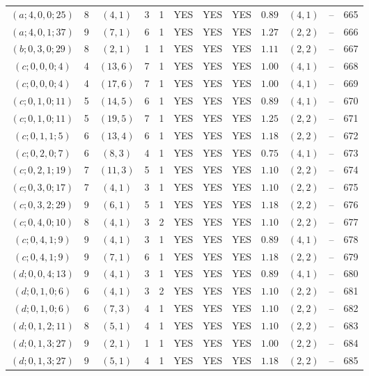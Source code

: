 \begin{longtable}{|c|c|c|c|c|c|c|c|c|c|c|c|}
$(a;4,0,0;25)$ & 8 & $(4,1)$ & 3 & 1 & YES & YES & YES & $0.89$ & $(4,1)$ & -- & 665\\
$(a;4,0,1;37)$ & 9 & $(7,1)$ & 6 & 1 & YES & YES & YES & $1.27$ & $(2,2)$ & -- & 666\\
$(b;0,3,0;29)$ & 8 & $(2,1)$ & 1 & 1 & YES & YES & YES & $1.11$ & $(2,2)$ & -- & 667\\
$(c;0,0,0;4)$ & 4 & $(13,6)$ & 7 & 1 & YES & YES & YES & $1.00$ & $(4,1)$ & -- & 668\\
$(c;0,0,0;4)$ & 4 & $(17,6)$ & 7 & 1 & YES & YES & YES & $1.00$ & $(4,1)$ & -- & 669\\
$(c;0,1,0;11)$ & 5 & $(14,5)$ & 6 & 1 & YES & YES & YES & $0.89$ & $(4,1)$ & -- & 670\\
$(c;0,1,0;11)$ & 5 & $(19,5)$ & 7 & 1 & YES & YES & YES & $1.25$ & $(2,2)$ & -- & 671\\
$(c;0,1,1;5)$ & 6 & $(13,4)$ & 6 & 1 & YES & YES & YES & $1.18$ & $(2,2)$ & -- & 672\\
$(c;0,2,0;7)$ & 6 & $(8,3)$ & 4 & 1 & YES & YES & YES & $0.75$ & $(4,1)$ & -- & 673\\
$(c;0,2,1;19)$ & 7 & $(11,3)$ & 5 & 1 & YES & YES & YES & $1.10$ & $(2,2)$ & -- & 674\\
$(c;0,3,0;17)$ & 7 & $(4,1)$ & 3 & 1 & YES & YES & YES & $1.10$ & $(2,2)$ & -- & 675\\
$(c;0,3,2;29)$ & 9 & $(6,1)$ & 5 & 1 & YES & YES & YES & $1.18$ & $(2,2)$ & -- & 676\\
$(c;0,4,0;10)$ & 8 & $(4,1)$ & 3 & 2 & YES & YES & YES & $1.10$ & $(2,2)$ & -- & 677\\
$(c;0,4,1;9)$ & 9 & $(4,1)$ & 3 & 1 & YES & YES & YES & $0.89$ & $(4,1)$ & -- & 678\\
$(c;0,4,1;9)$ & 9 & $(7,1)$ & 6 & 1 & YES & YES & YES & $1.18$ & $(2,2)$ & -- & 679\\
$(d;0,0,4;13)$ & 9 & $(4,1)$ & 3 & 1 & YES & YES & YES & $0.89$ & $(4,1)$ & -- & 680\\
$(d;0,1,0;6)$ & 6 & $(4,1)$ & 3 & 2 & YES & YES & YES & $1.10$ & $(2,2)$ & -- & 681\\
$(d;0,1,0;6)$ & 6 & $(7,3)$ & 4 & 1 & YES & YES & YES & $1.10$ & $(2,2)$ & -- & 682\\
$(d;0,1,2;11)$ & 8 & $(5,1)$ & 4 & 1 & YES & YES & YES & $1.10$ & $(2,2)$ & -- & 683\\
$(d;0,1,3;27)$ & 9 & $(2,1)$ & 1 & 1 & YES & YES & YES & $1.00$ & $(2,2)$ & -- & 684\\
$(d;0,1,3;27)$ & 9 & $(5,1)$ & 4 & 1 & YES & YES & YES & $1.18$ & $(2,2)$ & -- & 685\\

\end{longtable}
